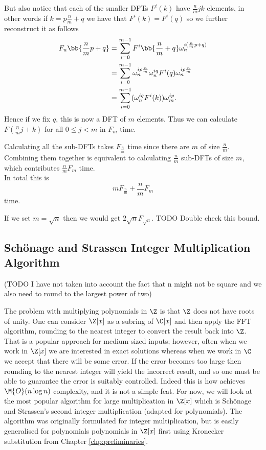 But also notice that each of the smaller DFTs $F^i(k)$ have $\frac{n}{m}jk$ elements, in other words if $k = p\frac{n}{m} + q$ we have that $F^i(k) = F^i(q)$ so we further reconstruct it as follows
\begin{align*}
    F_n\bb{\frac{n}{m}p + q} &= \sum^{m-1}_{i=0} F^i\bb{\frac{n}{m} + q}\omega^{i(\frac{n}{m}p + q)}_n\\
    &= \sum^{m-1}_{i=0} \omega^{ip\frac{n}{m}}_n \omega_n^{iq} F^i(q)\omega^{ip\frac{n}{m}}_n\\
    &= \sum^{m-1}_{i=0} (\omega^{iq}_n F^i(k))\omega^{ip}_m.
\end{align*}
Hence if we fix $q$, this is now a DFT of $m$ elements. Thus we can calculate $F(\frac{n}{m}j + k)$ for all $0 \leq j < m$ in $F_m$ time.

Calculating all the sub-DFTs takes $F_{\frac{n}{m}}$ time since there are $m$ of size $\frac{n}{m}$. Combining them together is equivalent to calculating $\frac{n}{m}$ sub-DFTs of size $m$, which contributes $\frac{n}{m}F_{m}$ time.\\
In total this is
\[
    mF_{\frac{n}{m}} + \frac{n}{m}F_m
\]
time.

If we set $m = \sqrt{n}$ then we would get $2\sqrt{n}F_{\sqrt{n}}$. TODO Double check this bound.


\subsection{Sch\"{o}nage and Strassen Integer Multiplication Algorithm}
\label{subsec:schon-strass}

(TODO I have not taken into account the fact that n might not be square and we also need to round to the largest power of two)

The problem with multiplying polynomials in $\Z$ is that $\Z$ does not have roots of unity. One can consider $\Z[x]$ as a subring of $\C[x]$ and then apply the FFT algorithm, rounding to the nearest integer to convert the result back into $\Z$. That is a popular approach for medium-sized inputs; however, often when we work in $\Z[x]$ we are interested in exact solutions whereas when we work in $\C$ we accept that there will be some error. If the error becomes too large then rounding to the nearest integer will yield the incorrect result, and so one must be able to guarantee the error is suitably controlled. Indeed this is how \cite{nlogn} achieves $\M{O}(n\log n)$ complexity, and it is not a simple feat. For now, we will look at the most popular algorithm for large multiplication in $\Z[x]$ which is Sch\"{o}nage and Strassen's second integer multiplication (adapted for polynomials). The algorithm was originally formulated for integer multiplication, but is easily generalised for polynomials polynomials in $\Z[x]$ first using Kronecker substitution from Chapter \ref{chp:preliminaries}.

